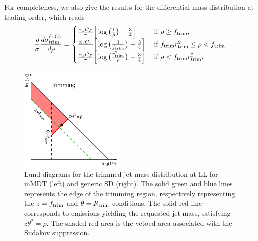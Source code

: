 For completeness, we also give the results for the differential mass
distribution at leading order, which reads
\begin{equation}  \label{eq:sigma-trimming-lo}
\frac{\rho}{\sigma} \frac{d\sigma^{\text{(LO)}}_\text{trim}}{d\rho}=
\begin{cases}
   \frac{\alpha_sC_F}{\pi}
    \Big[\log\big(\frac{1}{\rho}\big)-\frac{3}{4}\Big] \;
  &\text{if } \rho\ge f_{\text{trim}},\\
    \frac{\alpha_sC_F}{\pi}
    \Big[\log\big(\frac{1}{f_{\text{trim}}}\big)-\frac{3}{4}\Big] \;
  &\text{if } f_{\text{trim}}r_{\text{trim}}^2\le\rho<f_{\text{trim}} \\
   \frac{\alpha_sC_F}{\pi}
    \Big[\log\big(\frac{r_{\text{trim}}^2}{\rho}\big)-\frac{3}{4}\Big] \;
  &\text{if } \rho<f_{\text{trim}}r_{\text{trim}}^2.
  \end{cases}
\end{equation}

\begin{figure}[t!]
  \centering
  \includegraphics[width=0.45\textwidth]{figures/Lund-trim.pdf}%
  \caption{Lund diagrams for the trimmed jet mass distribution at LL
    for mMDT (left) and generic SD (right). The solid green and blue
    lines represents the edge of the trimming region, respectively
    representing the $z=f_{\text{trim}}$ and $\theta=R_{\text{trim}}$ conditions.
    The solid red line corresponds to emissions yielding the requested
    jet mass, \ie satisfying $z\theta^2=\rho$. The shaded red area is
    the vetoed area associated with the Sudakov
    suppression.}\label{fig:lund-trim}
\end{figure}
  

